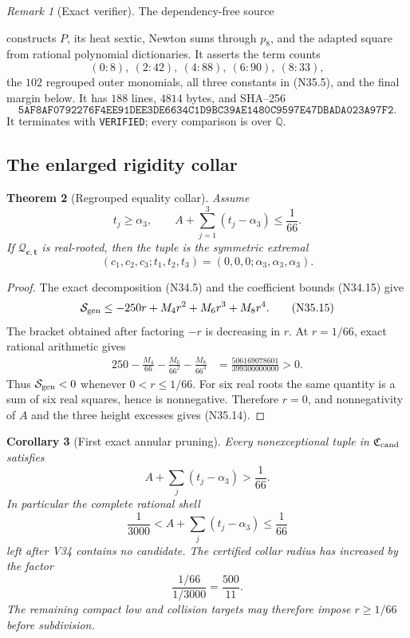\documentclass[11pt]{article}
\newtheorem{theorem}{Theorem}[section]
\newtheorem{corollary}[theorem]{Corollary}
\theoremstyle{definition}
\theoremstyle{remark}
\newtheorem{remark}[theorem]{Remark}
\begin{document}
\begin{remark}[Exact verifier]
\label{rem:f2v35-verifier}
The dependency-free source
\begin{center}
\end{center}
constructs \(P\), its heat sextic, Newton sums through \(p_8\), and the
adapted square from rational polynomial dictionaries.  It asserts the term
counts
\[
 (0:8),\ (2:42),\ (4:88),\ (6:90),\ (8:33),
\tag{N35.11}
\]
the \(102\) regrouped outer monomials, all three constants in
\textup{(N35.5)}, and the final margin below.  It has \(188\) lines,
\(4814\) bytes, and SHA--256
\[
\texttt{5AF8AF0792276F4EE91DEE3DE6634C1D9BC39AE1480C9597E47DBADA023A97F2}.
\tag{N35.12}
\]
It terminates with \texttt{VERIFIED}; every comparison is over
\(\mathbb Q\).
\end{remark}

\subsection{The enlarged rigidity collar}

\begin{theorem}[Regrouped equality collar]
\label{thm:f2v35-collar}
Assume
\[
 t_j\geq\alpha_3,\qquad
 A+\sum_{j=1}^3(t_j-\alpha_3)\leq\frac1{66}.
\tag{N35.13}
\]
If \(\mathcal Q_{\bm c,\bm t}\) is real-rooted, then the tuple is the
symmetric extremal
\[
 (c_1,c_2,c_3;t_1,t_2,t_3)
 =(0,0,0;\alpha_3,\alpha_3,\alpha_3).
\tag{N35.14}
\]
\end{theorem}

\begin{proof}
The exact decomposition \textup{(N34.5)} and the coefficient bounds
\textup{(N34.15)} give
\[
 \mathcal S_{\rm gen}
 \leq-250r+M_4r^2+M_6r^3+M_8r^4.
\tag{N35.15}
\]
The bracket obtained after factoring \(-r\) is decreasing in \(r\).
At \(r=1/66\), exact rational arithmetic gives
\[
\begin{aligned}
 250-\frac{M_4}{66}-\frac{M_6}{66^2}-\frac{M_8}{66^3}
 &=\frac{506169078601}{399300000000}>0.
\end{aligned}
\tag{N35.16}
\]
Thus \(\mathcal S_{\rm gen}<0\) whenever \(0<r\leq1/66\).  For six real
roots the same quantity is a sum of six real squares, hence is
nonnegative.  Therefore \(r=0\), and nonnegativity of \(A\) and the three
height excesses gives \textup{(N35.14)}.
\end{proof}

\begin{corollary}[First exact annular pruning]
\label{cor:f2v35-annular-pruning}
Every nonexceptional tuple in \(\mathfrak C_{\rm cand}\) satisfies
\[
 \boxed{A+\sum_j(t_j-\alpha_3)>\frac1{66}.}
\tag{N35.17}
\]
In particular the complete rational shell
\[
 \frac1{3000}<A+\sum_j(t_j-\alpha_3)\leq\frac1{66}
\tag{N35.18}
\]
left after V34 contains no candidate.  The certified collar radius has
increased by the factor
\[
 \frac{1/66}{1/3000}=\frac{500}{11}.
\tag{N35.19}
\]
The remaining compact low and collision targets may therefore impose
\(r\geq1/66\) before subdivision.
\end{corollary}
\end{document}
